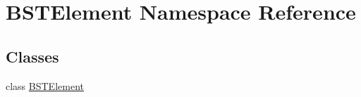 \hypertarget{namespace_b_s_t_element}{}\section{B\+S\+T\+Element Namespace Reference}
\label{namespace_b_s_t_element}
\subsection*{Classes}
\begin{DoxyCompactItemize}
\item 
class \hyperlink{class_b_s_t_element_1_1_b_s_t_element}{B\+S\+T\+Element}
\end{DoxyCompactItemize}
